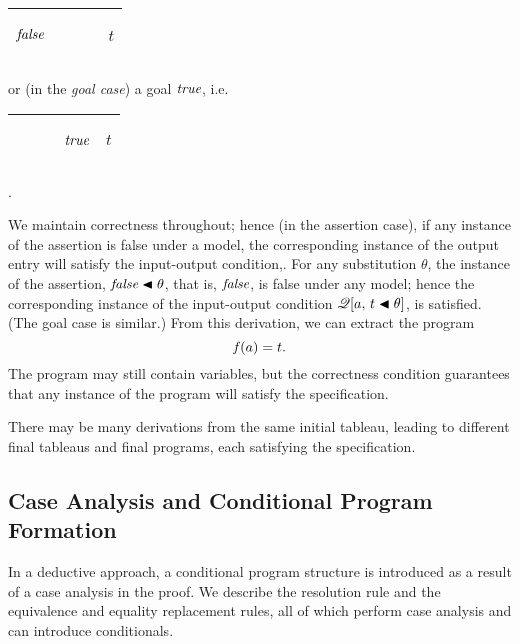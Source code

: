\documentclass[runningheads]{llncs}
\DeclareMathOperator{\uf}{\emph{f}\,}
\begin{document}
 \begin{center}
\begin{tabular}{T}
\hline
 \begin{center}$\emph{false}$\end{center} & $\qquad$ & \begin{center}$t$\end{center} \\
 
 \hline
\end{tabular}
\end{center}

\noindent or (in the \emph{goal case}) a goal $\emph{true}$, i.e.

   \begin{center}
\begin{tabular} {T}
\hline
    $\qquad$ & \begin{center}$\emph{true}$\end{center} & \begin{center}$t$\end{center} \\
 
 \hline
\end{tabular}.
\end{center}

We maintain correctness throughout;  hence (in the assertion case), if any instance of the assertion is false under a model, the corresponding instance of the output entry will satisfy the input-output condition,. For any substitution $\theta$, the instance of the assertion,  $\emph{false} \blacktriangleleft \theta$, that is, $\emph{false}$,  is  false under any model; hence the corresponding instance of the input-output condition   $\mathscr{Q}[a, \, t \blacktriangleleft \theta ]$, is satisfied.  (The goal case is similar.) 
From this derivation, we can extract the program
 \begin{equation*} \uf(a) =  t.
 \end{equation*}
 The program may still contain variables, but the correctness condition guarantees that any instance of the program will satisfy the specification. 
 
There may be many derivations from the same initial tableau, leading to different final tableaus and final programs, each satisfying the specification. 

 \subsection{Case Analysis and Conditional Program Formation} In a deductive approach, a conditional program structure is introduced as a result of a case analysis in the proof. 
 We describe the resolution rule and the equivalence and equality replacement rules, all of which perform case analysis and can introduce conditionals.
 
\end{document}
